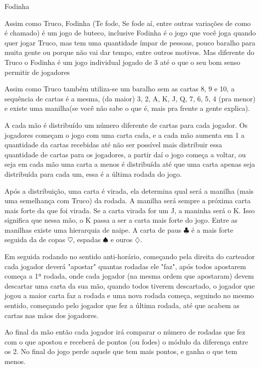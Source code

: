 ﻿\begin{subsecao}{Fodinha}

Assim como Truco, Fodinha (Te fode, Se fode aí, entre outras variações de como é chamado) é um jogo de buteco, inclusive Fodinha é o jogo
que você joga quando quer jogar Truco, mas tem uma quantidade ímpar de 
pessoas, pouco baralho para muita gente ou porque não vai dar tempo, entre outros motivos. Mas
diferente do Truco o Fodinha é um jogo individual jogado de 3 até o que o seu bom senso permitir de jogadores

Assim como Truco também utiliza-se um baralho sem as cartas 8, 9 e 10, a sequência
de cartas é a mesma, (da maior) 3, 2, A, K, J, Q, 7, 6, 5, 4 (pra menor)
e existe uma manilha(se você não sabe o que é, mais pra frente a gente explica).

A cada mão é distribuído um número diferente de cartas para cada jogador. Os
jogadores começam o jogo com uma carta cada, e a cada mão aumenta em 1 a
quantidade da cartas recebidas até não ser possível mais distribuir essa quantidade de cartas para os jogadores, a partir daí 
o jogo começa a voltar, ou seja em cada mão uma carta a menos é distribuída até que uma carta apenas seja distribuída para 
cada um, essa é a última rodada do jogo. 

Após a distribuição, uma carta é virada, ela determina qual será a 
manilha (mais uma semelhança com Truco) da rodada. A manilha será sempre a próxima carta mais forte da que foi virada.
Se a carta virada for um J, a maninha será o K. Isso significa que nessa mão, o
K passa a ser a carta mais forte do jogo. Entre as manilhas existe uma
hierarquia de naipe. A carta de paus $\clubsuit$  é a mais forte seguida da de copas $\heartsuit$,
espadas $\spadesuit$ e ouros $\diamondsuit$.

Em seguida rodando no sentido anti-horário, começando pela direita do carteador cada jogador deverá "apostar" 
quantas rodadas ele "faz", após todos apostarem começa a 1ª rodada, onde cada jogador (na mesma ordem que apostaram) 
devem descartar uma carta da sua mão, quando todos tiverem descartado, o jogador que jogou a maior carta faz a rodada 
e uma nova rodada começa, seguindo no mesmo sentido, começando pelo jogador que fez a última rodada, até que acabem
as cartas nas mãos dos jogadores.

Ao final da mão então cada jogador irá comparar o número de rodadas que fez com o que apostou e receberá de pontos (ou fodes) 
o módulo da diferença entre os 2. No final do jogo perde aquele que tem mais pontos, e ganha o que tem menos.


\end{subsecao}
